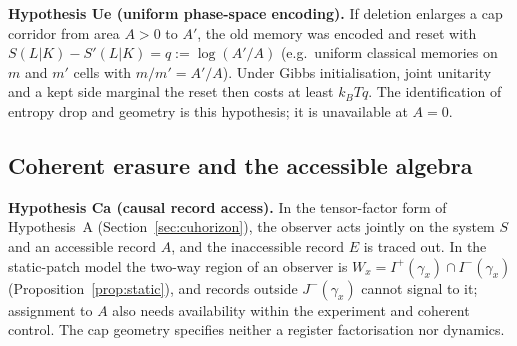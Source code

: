\documentclass[aps,pra,onecolumn,superscriptaddress,nofootinbib,10pt]{revtex4-2}
\theoremstyle{definition}
\theoremstyle{remark}
\begin{document}
\smallskip\noindent\textbf{Hypothesis Ue (uniform phase-space encoding).}  If deletion enlarges a cap corridor from area $A>0$ to
$A'$, the old memory was encoded and reset with $S(L|K)-S'(L|K)=q:=\log(A'/A)$ (e.g.\ uniform classical memories on $m$ and $m'$
cells with $m/m'=A'/A$).  Under Gibbs initialisation, joint unitarity and a kept side marginal the reset then costs
at least $k_BTq$.  The identification of entropy drop and geometry is this hypothesis; it is unavailable at $A=0$.

\subsection{Coherent erasure and the accessible algebra}\label{sec:fmerasure}

\smallskip\noindent\textbf{Hypothesis Ca (causal record access).}  In the tensor-factor form of Hypothesis~A
(Section~\ref{sec:cuhorizon}), the observer acts jointly on the system $S$ and an accessible record $A$, and the
inaccessible record $E$ is traced out.  In the static-patch model the two-way region of an observer is
$W_x=I^+(\gamma_x)\cap I^-(\gamma_x)$ (Proposition~\ref{prop:static}), and records outside $J^-(\gamma_x)$ cannot signal to it; assignment to $A$ also
needs availability within the experiment and coherent control.  The cap geometry specifies neither a
register factorisation nor dynamics.
\end{document}
